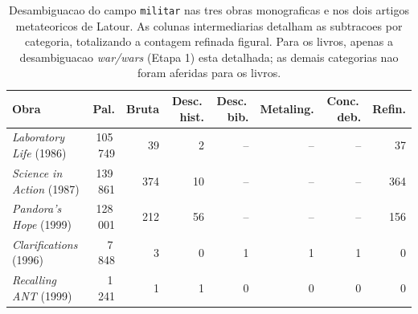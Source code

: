 \begin{table}[htbp]
\centering
\caption[Campo militar detalhado, 5 obras de Latour]{Desambiguacao do campo \texttt{militar} nas tres obras monograficas e nos dois artigos metateoricos de Latour. As colunas intermediarias detalham as subtracoes por categoria, totalizando a contagem refinada figural. Para os livros, apenas a desambiguacao \emph{war/wars} (Etapa 1) esta detalhada; as demais categorias nao foram aferidas para os livros.}
\label{tab:militar-refinado-5-obras-detalhada}
\footnotesize
\begin{tabular}{lrrrrrrr}
\toprule
Obra & Pal. & Bruta & Desc.\,hist. & Desc.\,bib. & Metaling. & Conc.\,deb. & Refin. \\
\midrule
\emph{Laboratory Life} (1986) & 105\,749 & 39 & 2 & -- & -- & -- & 37 \\
\emph{Science in Action} (1987) & 139\,861 & 374 & 10 & -- & -- & -- & 364 \\
\emph{Pandora's Hope} (1999) & 128\,001 & 212 & 56 & -- & -- & -- & 156 \\
\emph{Clarifications} (1996) & 7\,848 & 3 & 0 & 1 & 1 & 1 & 0 \\
\emph{Recalling ANT} (1999) & 1\,241 & 1 & 1 & 0 & 0 & 0 & 0 \\
\bottomrule
\end{tabular}
\end{table}
